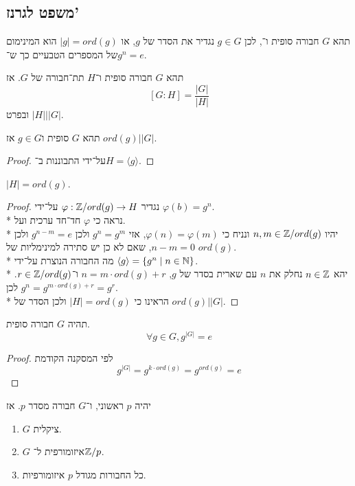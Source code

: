 \subsection{משפט לגרנז'}
\begin{definition}
	תהא $G$ חבורה סופית ו־, לכן $g \in G$ נגדיר את הסדר של $g$, או $|g| = ord(g)$ הוא המינימום של המספרים הטבעיים כך ש־$g^n = e$.
\end{definition}
\begin{theorem}
	תהא $G$ חבורה סופית ו־$H$ תת־חבורה של $G$. אז
	\[
		[G : H] = \frac{|G|}{|H|}
	\]
	ובפרט $|H| \Big| |G|$.
\end{theorem}
\begin{conclusion}
	תהא $G$ סופית ו$g \in G$ אז $ord(g) \Big| |G|$.
\end{conclusion}
\begin{proof}
	על־ידי התבוננות ב־$H = \langle g \rangle$.
\end{proof}
\begin{lemma}
	$|H| = ord(g)$.
\end{lemma}
\begin{proof}
	נגדיר $\varphi : \mathbb{Z}/ord(g) \to H$ על־ידי $\varphi(b) = g^n$. \\*
	נראה כי $\varphi$ חד־חד ערכית ועל. \\*
	יהיו $n, m \in \mathbb{Z}/ord(g)$ ונניח כי $\varphi(n) = \varphi(m)$, אזי $g^n = g^m$ ולכן $g^{n - m} = e$ ולכן $n - m = 0$, שאם לא כן יש סתירה למינימליות של $ord(g)$. \\*
	מה החבורה הנוצרת על־ידי $\langle g \rangle = \{ g^n \mid n \in \mathbb{N}\}$. \\*
	יהא $n \in \mathbb{Z}$ נחלק את $n$ עם שארית בסדר של $g$, $n = m \cdot ord(g) + r$ ו־$r \in \mathbb{Z}/ord(g)$. לכן $g^n = g^{m \cdot ord(g) + r} = g^r$. \\*
	הראינו כי $|H| = ord(g)$ ולכן הסדר של $ord(g) \Big| |G|$.
\end{proof}
\begin{conclusion}
	תהיה $G$ חבורה סופית.
	\[
		\forall g \in G, g^{|G|} = e
	\]
\end{conclusion}
\begin{proof}
	לפי המסקנה הקודמת
	\[
		g^{|G|} = g^{k \cdot ord(g)} = g^{ord(g)} = e
	\]
\end{proof}
\begin{conclusion}
	יהיה $p$ ראשוני, ו־$G$ חבורה מסדר $p$. אז
	\begin{enumerate}
		\item $G$ ציקלית.
		\item $G$ איזומורפית ל־$\mathbb{Z}/p$.
		\item כל החבורות מגודל $p$ איזומורפיות.
	\end{enumerate}
\end{conclusion}
